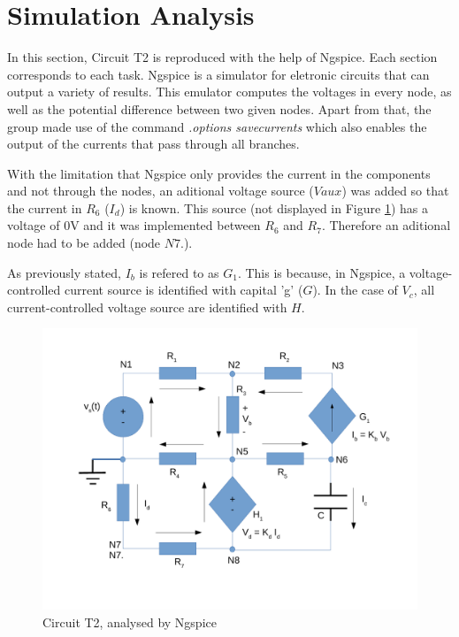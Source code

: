 \section{Simulation Analysis}
\label{sec:simulation}


In this section, Circuit T2 is reproduced with the help of Ngspice. Each section corresponds
to each task. Ngspice is a simulator for eletronic circuits that can output a variety of results.
This emulator computes the voltages in every node, as well as the potential difference
between two given nodes. Apart from that, the group made use of the command
{\em .options savecurrents} which also enables the output of the currents that pass
through all branches.

With the limitation that Ngspice only provides the current in the components and not through
the nodes, an aditional voltage source ($Vaux$) was added so that the current in $R_6$ ($I_d$)
is known. This source (not displayed in Figure \ref{fig:Dsnh_sim_t2}) has a voltage of 0V and it 
was implemented between $R_6$ and $R_7$. Therefore an aditional node had to be added (node $N7.$).

As previously stated, $I_b$ is refered to as $G_1$. This is because, in Ngspice, a
voltage-controlled current source is identified with capital 'g' ($G$). In the case of
$V_c$, all current-controlled voltage source are identified with $H$.

\begin{figure}[ht]
	\centering
	\includegraphics[width=0.85\linewidth]{dsnh_sim_t2.pdf}
	\caption{Circuit T2, analysed by Ngspice}
\label{fig:Dsnh_sim_t2}
\end{figure}


